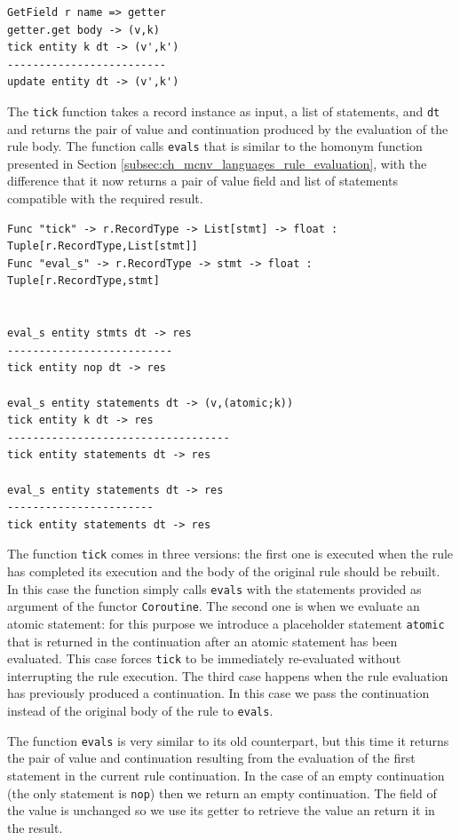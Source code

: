 \begin{lstlisting}
GetField r name => getter
getter.get body -> (v,k)
tick entity k dt -> (v',k')
-------------------------
update entity dt -> (v',k')
\end{lstlisting}

\noindent
The \texttt{tick} function takes a record instance as input, a list of statements, and \texttt{dt} and returns the pair of value and continuation produced by the evaluation of the rule body. The function calls \texttt{eval\tu s} that is similar to the homonym function presented in Section \ref{subsec:ch_mcnv_languages_rule_evaluation}, with the difference that it now returns a pair of value field and list of statements compatible with the required result.

\begin{lstlisting}
Func "tick" -> r.RecordType -> List[stmt] -> float : Tuple[r.RecordType,List[stmt]]
Func "eval_s" -> r.RecordType -> stmt -> float : Tuple[r.RecordType,stmt]


eval_s entity stmts dt -> res
--------------------------
tick entity nop dt -> res

eval_s entity statements dt -> (v,(atomic;k))
tick entity k dt -> res
-----------------------------------
tick entity statements dt -> res

eval_s entity statements dt -> res
-----------------------
tick entity statements dt -> res
\end{lstlisting}

\noindent
The function \texttt{tick} comes in three versions: the first one is executed when the rule has completed its execution and the body of the original rule should be rebuilt. In this case the function simply calls \texttt{eval\tu s} with the statements provided as argument of the functor \texttt{Coroutine}. The second one is when we evaluate an atomic statement: for this purpose we introduce a placeholder statement \texttt{atomic} that is returned in the continuation after an atomic statement has been evaluated. This case forces \texttt{tick} to be immediately re-evaluated without interrupting the rule execution. The third case happens when the rule evaluation has previously produced a continuation. In this case we pass the continuation instead of the original body of the rule to \texttt{eval\tu s}.

The function \texttt{eval\tu s} is very similar to its old counterpart, but this time it returns the pair of value and continuation resulting from the evaluation of the first statement in the current rule continuation. In the case of an empty continuation (the only statement is \texttt{nop}) then we return an empty continuation. The field of the value is unchanged so we use its getter to retrieve the value an return it in the result.

